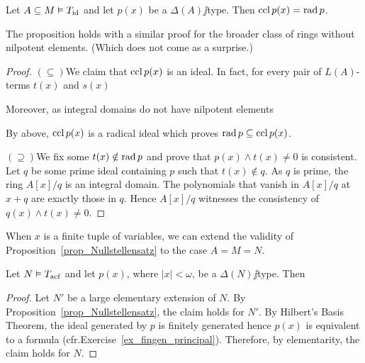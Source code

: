 \documentclass[creche.tex]{subfiles}
\begin{document}
\begin{proposition}\label{prop_chiusura-radicale}
Let $A\subseteq M\models T_{\rm id}$ and let $p(x)$ be a $\Delta(A)\jj$type. Then $\ccl\,p(x)=\rad p$.
\end{proposition}
The proposition holds with a similar proof for the broader class of rings without nilpotent elements. (Which does not come as a surprise.)
\begin{proof}
$(\subseteq)$\quad We claim that $\ccl\,p(x)$ is an ideal. In fact, for every pair of $L(A)$-terms $t(x)$ and $s(x)$



Moreover, as integral domains do not have nilpotent elements


By \ssf{\#} above, $\ccl\,p(x)$ is a radical ideal which proves $\rad p\subseteq \ccl\,p(x)$.

$(\supseteq)$\quad We fix some $t(x)\notin\rad p$ and prove that $p(x)\wedge t(x)\neq0$ is consistent. Let $q$ be some prime ideal containing $p$ such that $t(x)\notin q$.  As $q$ is prime, the ring $A[x]/q$ is an integral domain. The polynomials that vanish in  $A[x]/q$ at $x+q$ are exactly those in $q$. Hence $A[x]/q$ witnesses the consistency of $q(x)\wedge t(x)\neq0$.
\end{proof}

When $x$ is a finite tuple of variables, we can extend the validity of Proposition~\ref{prop_Nullstellensatz} to the case $A=M=N$.

\begin{corollary}\label{coroll_Nullstellensatz}
Let $N\models T_{\rm acf}$ and let $p(x)$, where $|x|<\omega$, be a $\Delta(N)\jj$type. Then


\end{corollary}



\begin{proof}
Let $N'$ be a large elementary extension of $N$. By Proposition~\ref{prop_Nullstellensatz}, the claim holds for $N'$. By Hilbert's Basis Theorem, the ideal generated by $p$ is finitely generated hence $p(x)$ is equivalent to a formula (cfr.\@ Exercise~\ref{ex_fingen_principal}). Therefore, by elementarity, the claim holds for $N$.
\end{proof}
\end{document}

